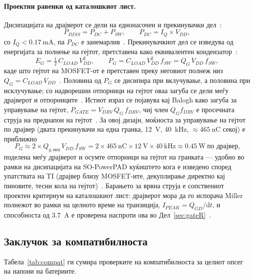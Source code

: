 \documentclass[journal,onecolumn,11pt]{IEEEtran}
\begin{document}
\paragraph{Проектни равенки од каталошкиот лист.} Дисипацијата на драјверот се дели
на еднонасочен и прекинувачки дел~\cite{ucc27211}:
\begin{equation}
P_{DISS}=P_{DC}+P_{SW},\qquad P_{DC}=I_Q\times V_{DD},
\end{equation}
со $I_Q<\SI{0.17}{\milli\ampere}$, па $P_{DC}$ е занемарлив~\cite{ucc27211}.
Прекинувачкиот дел се изведува од енергијата за полнење на гејтот, претставена како
еквивалентен кондензатор~\cite{ucc27211}:
\begin{equation}
E_G=\tfrac{1}{2}\,C_{LOAD}\,V_{DD}^{2},\qquad
P_G=C_{LOAD}\,V_{DD}^{2}\,f_{SW}=Q_G\,V_{DD}\,f_{SW},
\end{equation}
каде што гејтот на MOSFET-от е претставен преку неговиот полнеж низ
$Q_G=C_{LOAD}\,V_{DD}$~\cite{ucc27211}. Половина од $P_G$ се дисипира при вклучување,
а половина при исклучување; со надворешни отпорници на гејтот оваа загуба се дели
меѓу драјверот и отпорниците~\cite{ucc27211}. Истиот израз се појавува кај Balogh
како загуба за управување на гејтот, $P_{GATE}=V_{DRV}\,Q_G\,f_{DRV}$, чиј член
$Q_G f_{DRV}$ е просечната струја на преднапон на гејтот~\cite{balogh}. За овој
дизајн, моќноста за управување на гејтот по драјвер (двата прекинувачи на една
гранка, \SI{12}{\volt}, \SI{40}{\kilo\hertz}, $\approx\SI{465}{\nano\coulomb}$ секој)
е приближно
\begin{equation}
P_G\approx 2\times Q_{g,\text{поз}}\,V_{DD}\,f_{SW}
        =2\times\SI{465}{\nano\coulomb}\times\SI{12}{\volt}\times\SI{40}{\kilo\hertz}
        \approx\SI{0.45}{\watt}\ \text{по драјвер,}
\end{equation}
поделена меѓу драјверот и осумте отпорници на гејтот на гранката --- удобно во рамки
на дисипацијата на SO-PowerPAD куќиштето кога е изведено според упатствата на TI
(драјвер близу MOSFET-ите, декуплирање директно кај пиновите, тесни кола на
гејтот)~\cite{ucc27211}. Барањето за врвна струја е сопствениот проектен критериум на
каталошкиот лист: драјверот мора да го испорача Miller полнежот во рамки на целното
време на транзиција, $I_{PEAK}=Q_{GD}/\mathrm{d}t$, и способноста од \SI{3.7}{\ampere}
е проверена наспроти ова во Дел~\ref{sec:gateR}~\cite{ucc27211}.

\subsection{Заклучок за компатибилноста}
Табела~\ref{tab:compat} ги сумира проверките на компатибилноста за целиот опсег на
напони на батериите.
\end{document}
